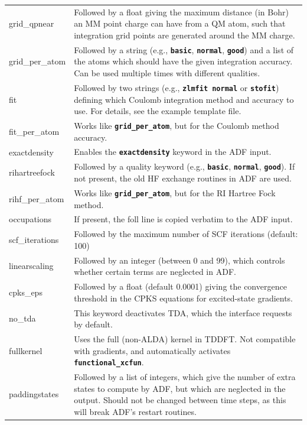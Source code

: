 \documentclass[a4paper,10pt,DIV=15,openany]{scrbook}
\newcommand{\ttt}[1]{\textbf{\texttt{#1}}}
\begin{document}
\begin{table}
\begin{tabular}{>{\ttfamily}lp{12cm}}
\\
grid\_qpnear            &Followed by a float giving the maximum distance (in Bohr) an MM point charge can have from a QM atom, such that integration grid points are generated around the MM charge.
\\
grid\_per\_atom         &Followed by a string (e.g., \ttt{basic}, \ttt{normal}, \ttt{good}) and a list of the atoms which should have the given integration accuracy. Can be used multiple times with different qualities.
\\
fit                     &Followed by two strings (e.g., \ttt{zlmfit normal} or \ttt{stofit}) defining which Coulomb integration method and accuracy to use. For details, see the example template file.
\\
fit\_per\_atom          &Works like \ttt{grid\_per\_atom}, but for the Coulomb method accuracy.
\\
exactdensity            &Enables the \ttt{exactdensity} keyword in the ADF input.
\\
rihartreefock           &Followed by a quality keyword (e.g., \ttt{basic}, \ttt{normal}, \ttt{good}). If not present, the old HF exchange routines in ADF are used.
\\
rihf\_per\_atom         &Works like \ttt{grid\_per\_atom}, but for the RI Hartree Fock method.
\\
occupations             &If present, the foll line is copied verbatim to the ADF input.
\\
scf\_iterations         &Followed by the maximum number of SCF iterations (default: 100)
\\
linearscaling           &Followed by an integer (between 0 and 99), which controls whether certain terms are neglected in ADF.
\\
cpks\_eps               &Followed by a float (default 0.0001) giving the convergence threshold in the CPKS equations for excited-state gradients.
\\
no\_tda                 &This keyword deactivates TDA, which the interface requests by default.
\\
fullkernel              &Uses the full (non-ALDA) kernel in TDDFT. Not compatible with gradients, and automatically activates \ttt{functional\_xcfun}.
\\
paddingstates           &Followed by a list of integers, which give the number of extra states to compute by ADF, but which are neglected in the output. Should not be changed between time steps, as this will break ADF's restart routines.
\\

\end{tabular}
\end{table}
\end{document}
